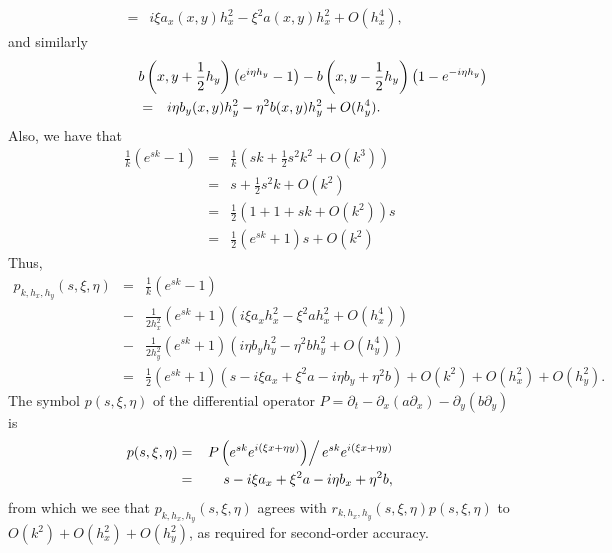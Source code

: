 \documentclass{article}
\begin{document}
\begin{enumerate}
\begin{enumerate}
\begin{eqnarray*}
& = & i \xi a_x(x,y) h_x^2 - \xi^2 a(x,y) h_x^2 + O(h_x^4),
\end{eqnarray*}
and similarly
\begin{eqnarray*}
\lefteqn{b \left( x, y + \frac{1}{2} h_y \right) \left( e^{i\eta h_y} - 1 \right) - b \left( x, y - \frac{1}{2} h_y \right) \left( 1 - e^{-i\eta h_y} \right)} \\
& = & i \eta b_y(x,y) h_y^2 - \eta^2 b(x,y) h_y^2 + O(h_y^4).
\end{eqnarray*}
Also, we have that
\begin{eqnarray*}
\frac{1}{k} \left( e^{sk} - 1 \right)
& = & \frac{1}{k} \left( sk + \frac{1}{2} s^2 k^2 + O(k^3) \right) \\
& = & s + \frac{1}{2} s^2 k + O(k^2) \\
& = & \frac{1}{2} \left( 1 + 1 + sk + O(k^2) \right) s \\
& = & \frac{1}{2} \left( e^{sk} + 1 \right) s + O(k^2)
\end{eqnarray*}
Thus,
\begin{eqnarray*}
p_{k,h_x,h_y}(s,\xi,\eta)
& = & \frac{1}{k} \left( e^{sk} - 1 \right) \\
& - & \frac{1}{2h_x^2} \left( e^{sk} + 1 \right) \left( i \xi a_x h_x^2 - \xi^2 a h_x^2 + O(h_x^4) \right) \\
& - & \frac{1}{2h_y^2} \left( e^{sk} + 1 \right) \left( i \eta b_y h_y^2 - \eta^2 b h_y^2 + O(h_y^4) \right) \\
& = & \frac{1}{2} \left( e^{sk} + 1 \right) \left( s - i \xi a_x + \xi^2 a - i \eta b_y + \eta^2 b \right) + O(k^2) + O(h_x^2) + O(h_y^2).
\end{eqnarray*}
The symbol \(p(s,\xi,\eta)\) of the differential operator \(P = \partial_t - \partial_x(a\partial_x) - \partial_y(b\partial_y)\) is
\begin{eqnarray*}
p(s,\xi,\eta) & = & \left. P \left( e^{sk} e^{i(\xi x + \eta y)} \right) \right/ e^{sk} e^{i(\xi x + \eta y)} \\
              & = & s - i \xi a_x + \xi^2 a - i \eta b_x + \eta^2 b,
\end{eqnarray*}
from which we see that \(p_{k,h_x,h_y}(s,\xi,\eta)\) agrees with \(r_{k,h_x,h_y}(s,\xi,\eta) p(s,\xi,\eta)\) to \(O(k^2) + O(h_x^2) + O(h_y^2)\), as required for second-order accuracy.


\end{enumerate}
\end{enumerate}
\end{document}
